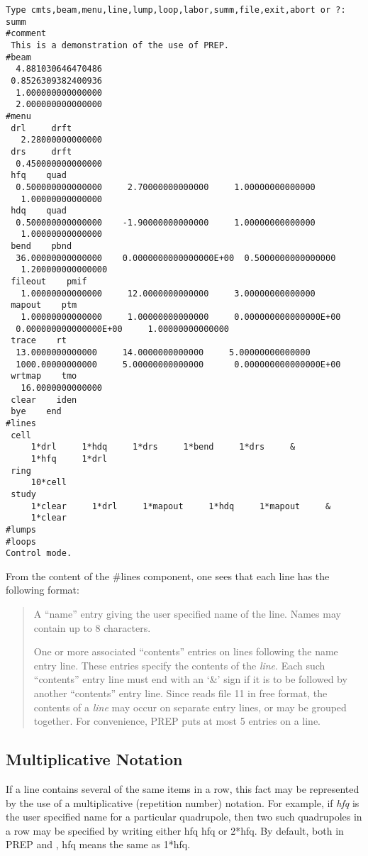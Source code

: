\begin{footnotesize}
\begin{verbatim}
Type cmts,beam,menu,line,lump,loop,labor,summ,file,exit,abort or ?:
summ
#comment
 This is a demonstration of the use of PREP.
#beam
  4.881030646470486
 0.8526309382400936
  1.000000000000000
  2.000000000000000
#menu
 drl     drft
   2.28000000000000
 drs     drft
  0.450000000000000
 hfq    quad
  0.500000000000000     2.70000000000000     1.00000000000000
   1.00000000000000
 hdq    quad
  0.500000000000000    -1.90000000000000     1.00000000000000
   1.00000000000000
 bend    pbnd
  36.00000000000000    0.0000000000000000E+00  0.5000000000000000
   1.200000000000000
 fileout    pmif
   1.00000000000000     12.0000000000000     3.00000000000000
 mapout    ptm
   1.00000000000000     1.00000000000000     0.000000000000000E+00
  0.000000000000000E+00     1.00000000000000
 trace    rt
  13.0000000000000     14.0000000000000     5.00000000000000
  1000.00000000000     5.00000000000000      0.000000000000000E+00
 wrtmap    tmo
   16.0000000000000
 clear    iden
 bye    end
#lines
 cell
     1*drl     1*hdq     1*drs     1*bend     1*drs     &
     1*hfq     1*drl
 ring
     10*cell
 study
     1*clear     1*drl     1*mapout     1*hdq     1*mapout     &
     1*clear
#lumps
#loops
Control mode.
\end{verbatim}
\end{footnotesize} From the content of the \#lines component, one sees that
each line has the following format:
\begin{quotation} A ``name'' entry giving the user specified name of the
line. Names may contain up to 8 characters.

One or more associated ``contents'' entries on lines following the name
entry line. These entries specify the contents of the {\em line}. Each such
``contents'' entry line must end with an `\&' sign if it is to be followed
by another ``contents'' entry line. Since \Mary reads file 11 in free
format, the contents of a {\em line} may occur on separate entry lines, or
may be grouped together. For convenience, PREP puts at most 5 entries on a
line.
\end{quotation}

\subsection{Multiplicative Notation}  If a line contains several of the same
items in a row, this fact may be represented by the use of a multiplicative
(repetition number) notation. For example, if {\em hfq} is the user
specified name for a particular quadrupole, then two such quadrupoles in a
row may be specified by writing either hfq hfq or 2*hfq. By default, both
in PREP and \Mary $\!\!$, hfq means the same as 1*hfq.

